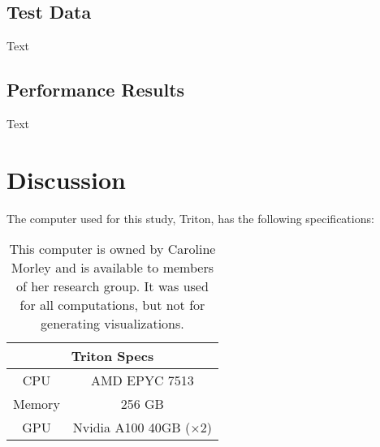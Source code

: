 \documentclass[twocolumn]{aastex631}
\begin{document}
\subsection{Test Data}
Text

\subsection{Performance Results}
Text

\section{Discussion}
The computer used for this study, Triton, has the following specifications:
\begin{table}[h]
    \hspace*{0.7cm}\begin{tabular}{|c|c|}
        \hline
        \multicolumn{2}{|c|}{\textbf{Triton Specs}}\\
        \hline\hline
        CPU & AMD EPYC 7513\\
        Memory & 256 GB\\
        GPU & Nvidia A100 40GB ($\times$2)\\
        \hline
    \end{tabular}
    \caption{This computer is owned by Caroline Morley and is available to
    members of her research group. It was used for all computations, but not 
    for generating visualizations.}
\end{table}
\end{document}

